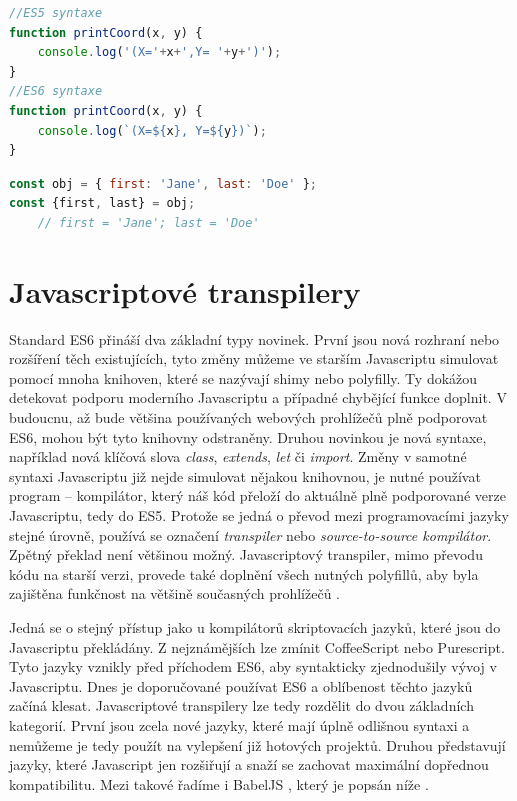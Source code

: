 \begin{lstlisting}[language=Javascript,caption={Ukázka použití šablon pro řetězce v ES6 \cite{exploring_es6}. }]
//ES5 syntaxe
function printCoord(x, y) {
    console.log('(X='+x+',Y= '+y+')');
}
//ES6 syntaxe
function printCoord(x, y) {
    console.log(`(X=${x}, Y=${y})`);
}

\end{lstlisting}

\begin{lstlisting}[language=Javascript, caption={Ukázka použítí destructuringu v ES6 \cite{exploring_es6}}]
const obj = { first: 'Jane', last: 'Doe' };
const {first, last} = obj;
    // first = 'Jane'; last = 'Doe'
\end{lstlisting}

\section{Javascriptové transpilery}
\label{sec:js_transpilers}
Standard ES6 přináší dva základní typy novinek.  První jsou nová rozhraní nebo rozšíření těch existujících, tyto změny můžeme ve starším Javascriptu simulovat pomocí mnoha knihoven, které se nazývají shimy nebo polyfilly. Ty dokážou detekovat podporu moderního Javascriptu a případné chybějící funkce doplnit. V budoucnu, až bude většina používaných webových prohlížečů plně podporovat ES6, mohou být tyto knihovny odstraněny. Druhou novinkou je nová syntaxe, například nová klíčová slova \textit{class}, \textit{extends}, \textit{let} či \textit{import}. Změny v samotné syntaxi Javascriptu již nejde simulovat nějakou knihovnou, je nutné používat program – kompilátor, který náš kód přeloží do aktuálně plně podporované verze Javascriptu, tedy do ES5. Protože se jedná o převod mezi programovacími jazyky stejné úrovně, používá se označení \textit{transpiler} nebo \textit{source-to-source kompilátor}. Zpětný překlad není většinou možný. Javascriptový transpiler, mimo převodu kódu na starší verzi, provede také doplnění všech nutných polyfillů, aby byla zajištěna funkčnost na většině současných prohlížečů \cite{learning_es6} \cite{transpilers}.

Jedná se o stejný přístup jako u kompilátorů skriptovacích jazyků, které jsou do Javascriptu překládány. Z nejznámějších lze zmínit CoffeeScript nebo Purescript. Tyto jazyky vznikly před příchodem ES6, aby syntakticky zjednodušily vývoj v Javascriptu. Dnes je doporučované používat ES6 a oblíbenost těchto jazyků začíná klesat. Javascriptové transpilery lze tedy rozdělit do dvou základních kategorií. První jsou zcela nové jazyky, které mají úplně odlišnou syntaxi a nemůžeme je tedy použít na vylepšení již hotových projektů. Druhou představují jazyky, které Javascript jen rozšiřují a snaží se zachovat maximální dopřednou kompatibilitu. Mezi takové řadíme i BabelJS \cite{babel}, který je popsán níže \cite{learning_es6} \cite{transpilers}.

